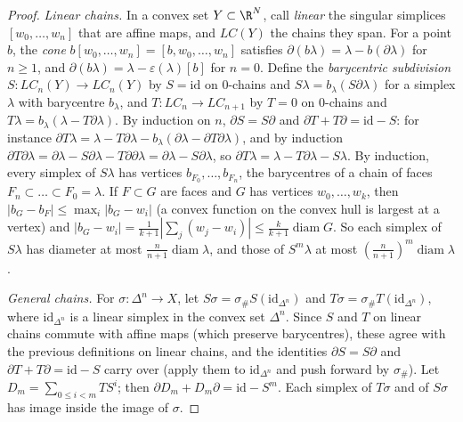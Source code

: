 \begin{proof}
\emph{Linear chains.} In a convex set $Y\subset\R^N$, call \emph{linear} the singular simplices $[w_0,\dots,w_n]$ that are affine maps, and $LC(Y)$ the chains they span. For a point $b$, the \emph{cone}
$b[w_0,\dots,w_n]=[b,w_0,\dots,w_n]$ satisfies $\partial(b\lambda)=\lambda-b(\partial\lambda)$ for $n\ge1$, and $\partial(b\lambda)=\lambda-\varepsilon(\lambda)[b]$ for $n=0$. Define the \emph{barycentric subdivision}
$S\colon LC_n(Y)\to LC_n(Y)$ by $S=\mathrm{id}$ on $0$-chains and $S\lambda=b_\lambda(S\partial\lambda)$ for a simplex $\lambda$ with barycentre $b_\lambda$, and $T\colon LC_n\to LC_{n+1}$ by $T=0$ on $0$-chains and
$T\lambda=b_\lambda(\lambda-T\partial\lambda)$. By induction on $n$, $\partial S=S\partial$ and $\partial T+T\partial=\mathrm{id}-S$: for instance $\partial T\lambda=\lambda-T\partial\lambda-b_\lambda(\partial\lambda-\partial T\partial\lambda)$, and by induction
$\partial T\partial\lambda=\partial\lambda-S\partial\lambda-T\partial\partial\lambda=\partial\lambda-S\partial\lambda$, so $\partial T\lambda=\lambda-T\partial\lambda-S\lambda$. By induction, every simplex of $S\lambda$ has vertices $b_{F_0},\dots,b_{F_n}$, the
barycentres of a chain of faces $F_n\subset\dots\subset F_0=\lambda$. If $F\subset G$ are faces and $G$ has vertices $w_0,\dots,w_k$, then $|b_G-b_F|\le\max_i|b_G-w_i|$ (a convex function on the convex hull is
largest at a vertex) and $|b_G-w_i|=\frac1{k+1}|\sum_j(w_j-w_i)|\le\frac k{k+1}\operatorname{diam}G$. So each simplex of $S\lambda$ has diameter at most $\frac n{n+1}\operatorname{diam}\lambda$, and those of $S^m\lambda$
at most $(\frac n{n+1})^m\operatorname{diam}\lambda$.

\emph{General chains.} For $\sigma\colon\Delta^n\to X$, let $S\sigma=\sigma_\#S(\mathrm{id}_{\Delta^n})$ and $T\sigma=\sigma_\#T(\mathrm{id}_{\Delta^n})$, where $\mathrm{id}_{\Delta^n}$ is a linear simplex in the convex set $\Delta^n$. Since $S$
and $T$ on linear chains commute with affine maps (which preserve barycentres), these agree with the previous definitions on linear chains, and the identities $\partial S=S\partial$ and
$\partial T+T\partial=\mathrm{id}-S$ carry over (apply them to $\mathrm{id}_{\Delta^n}$ and push forward by $\sigma_\#$). Let $D_m=\sum_{0\le i<m}TS^i$; then $\partial D_m+D_m\partial=\mathrm{id}-S^m$. Each simplex of $T\sigma$ and of $S\sigma$ has
image inside the image of $\sigma$.


\end{proof}
